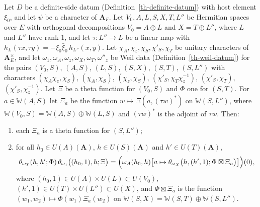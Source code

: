 \begin{theorem}\label{th-seesaw-identity}
Let $D$ be a definite-side datum (Definition~\ref{th-definite-datum}) with
host element $\xi_0$, and let $\psi$ be a character of $\mathbf A_F$. Let
$V_0,A,L,S,X,T,L''$ be Hermitian spaces over $E$ with orthogonal
decompositions $V_0=A\oplus L$ and $X=T\oplus L''$, where $L$ and $L''$ have
rank $1$, and let $\tau\colon L''\to L$ be a linear map with
$h_L(\tau x,\tau y)=-\xi_0\bar\xi_0\,h_{L''}(x,y)$. Let
$\chi_A,\chi_z,\chi_S,\chi'_S,\chi_T$ be unitary characters of
$\mathbf A_E^\times$, and let $\omega_1,\omega_A,\omega_z,\omega_X,\omega_T,\omega''_z$
be Weil data (Definition~\ref{th-weil-datum}) for the pairs $(V_0,S)$,
$(A,S)$, $(L,S)$, $(S,X)$, $(S,T)$, $(S,L'')$ with characters
$(\chi_A\chi_z,\chi_S)$, $(\chi_A,\chi_S)$, $(\chi_z,\chi_S)$,
$(\chi'_S,\chi_T\chi_z^{-1})$, $(\chi'_S,\chi_T)$, $(\chi'_S,\chi_z^{-1})$.
Let $\Xi$ be a theta function for $(V_0,S)$ and $\Phi$ one for $(S,T)$. For
$a\in\mathbb W(A,S)$ let $\Xi_a$ be the function
$w\mapsto\Xi(a,(\tau w)^*)$ on $\mathbb W(S,L'')$, where
$\mathbb W(V_0,S)=\mathbb W(A,S)\oplus\mathbb W(L,S)$ and $(\tau w)^*$ is the
adjoint of $\tau w$. Then:
\begin{enumerate}
\item each $\Xi_a$ is a theta function for $(S,L'')$;
\item for all $h_0\in U(A)(\mathbf A)$, $h\in U(S)(\mathbf A)$ and
  $h'\in U(T)(\mathbf A)$,
  \[
  \theta_{\omega_T}(h,h';\Phi)\,\theta_{\omega_1}\bigl((h_0,1),h;\Xi\bigr)
  =\Bigl(\omega_A(h_0,h)\bigl[a\mapsto\theta_{\omega_X}\bigl(h,(h',1);\Phi\boxtimes\Xi_a\bigr)\bigr]\Bigr)(0),
  \]
  where $(h_0,1)\in U(A)\times U(L)\subset U(V_0)$,
  $(h',1)\in U(T)\times U(L'')\subset U(X)$, and $\Phi\boxtimes\Xi_a$ is the
  function $(w_1,w_2)\mapsto\Phi(w_1)\Xi_a(w_2)$ on
  $\mathbb W(S,X)=\mathbb W(S,T)\oplus\mathbb W(S,L'')$.
\end{enumerate}
\end{theorem}
